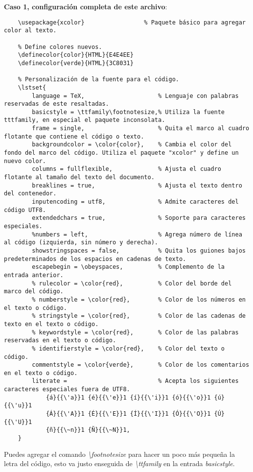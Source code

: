 \textbf{Caso 1, configuración completa de este archivo}:
\begin{lstlisting}
    \usepackage{xcolor}                 % Paquete básico para agregar color al texto.

    % Define colores nuevos.
    \definecolor{color}{HTML}{E4E4EE}
    \definecolor{verde}{HTML}{3C8031}

    % Personalización de la fuente para el código.
    \lstset{
        language = TeX,                     % Lenguaje con palabras reservadas de este resaltadas.
        basicstyle = \ttfamily\footnotesize,% Utiliza la fuente tttfamily, en especial el paquete inconsolata.
        frame = single,                     % Quita el marco al cuadro flotante que contiene el código o texto.
        backgroundcolor = \color{color},    % Cambia el color del fondo del marco del código. Utiliza el paquete "xcolor" y define un nuevo color.
        columns = fullflexible,             % Ajusta el cuadro flotante al tamaño del texto del documento.
        breaklines = true,                  % Ajusta el texto dentro del contenedor.
        inputencoding = utf8,               % Admite caracteres del código UTF8.
        extendedchars = true,               % Soporte para caracteres especiales.
        %numbers = left,                    % Agrega número de línea al código (izquierda, sin número y derecha).
        showstringspaces = false,           % Quita los guiones bajos predeterminados de los espacios en cadenas de texto.
        escapebegin = \obeyspaces,          % Complemento de la entrada anterior.
        % rulecolor = \color{red},          % Color del borde del marco del código.
        % numberstyle = \color{red},        % Color de los números en el texto o código.
        % stringstyle = \color{red},        % Color de las cadenas de texto en el texto o código.
        % keywordstyle = \color{red},       % Color de las palabras reservadas en el texto o código.
        % identifierstyle = \color{red},    % Color del texto o código.
        commentstyle = \color{verde},       % Color de los comentarios en el texto o código.
        literate =                          % Acepta los siguientes caracteres especiales fuera de UTF8.
            {á}{{\'a}}1 {é}{{\'e}}1 {í}{{\'i}}1 {ó}{{\'o}}1 {ú}{{\'u}}1
            {Á}{{\'A}}1 {É}{{\'E}}1 {Í}{{\'I}}1 {Ó}{{\'O}}1 {Ú}{{\'U}}1
            {ñ}{{\~n}}1 {Ñ}{{\~N}}1,
    }
\end{lstlisting}

Puedes agregar el comando \textit{\textbackslash{footnotesize}} para hacer un poco más pequeña la letra del código, esto va justo enseguida de \textit{\textbackslash{ttfamily}} en la entrada \textit{basicstyle}.

